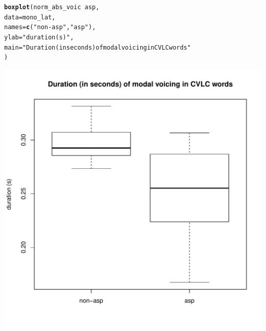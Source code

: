 \documentclass[a4paper,11pt]{article}\usepackage[]{graphicx}\usepackage[]{color}
\makeatletter
\def\maxwidth{ %
  \ifdim\Gin@nat@width>\linewidth
    \linewidth
  \else
    \Gin@nat@width
  \fi
}
\newcommand{\hlstr}[1]{\textcolor[rgb]{0.192,0.494,0.8}{#1}}%
\newcommand{\hlopt}[1]{\textcolor[rgb]{0,0,0}{#1}}%
\newcommand{\hlstd}[1]{\textcolor[rgb]{0.345,0.345,0.345}{#1}}%
\newcommand{\hlkwc}[1]{\textcolor[rgb]{0.333,0.667,0.333}{#1}}%
\newcommand{\hlkwd}[1]{\textcolor[rgb]{0.737,0.353,0.396}{\textbf{#1}}}%
\newenvironment{kframe}{%
 \def\at@end@of@kframe{}%
 \ifinner\ifhmode%
  \def\at@end@of@kframe{\end{minipage}}%
  \begin{minipage}{\columnwidth}%
 \fi\fi%
 \def\FrameCommand##1{\hskip\@totalleftmargin \hskip-\fboxsep
 \colorbox{shadecolor}{##1}\hskip-\fboxsep
     \hskip-\linewidth \hskip-\@totalleftmargin \hskip\columnwidth}%
 \MakeFramed {\advance\hsize-\width
   \@totalleftmargin\z@ \linewidth\hsize
   \@setminipage}}%
 {\par\unskip\endMakeFramed%
 \at@end@of@kframe}
\newenvironment{knitrout}{}{} %
\makeatother
\begin{document}
\begin{knitrout}
\end{knitrout}

\begin{knitrout}
\color{fgcolor}\begin{kframe}
\begin{alltt}
\hlkwd{boxplot}\hlstd{(norm_abs_voic} \hlopt{~} \hlstd{asp,}
        \hlkwc{data} \hlstd{= mono_lat,}
        \hlkwc{names} \hlstd{=} \hlkwd{c}\hlstd{(}\hlstr{"non-asp"}\hlstd{,} \hlstr{"asp"}\hlstd{),}
        \hlkwc{ylab} \hlstd{=} \hlstr{"duration (s)"}\hlstd{,}
        \hlkwc{main} \hlstd{=} \hlstr{"Duration (in seconds) of modal voicing in CVLC words"}
        \hlstd{)}
\end{alltt}
\end{kframe}
\includegraphics[width=\maxwidth]{img/mono-lat-box-1} 

\end{knitrout}
\end{document}
